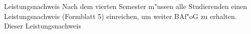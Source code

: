 \begin{artikel}{Leistungsnachweis}
\vspace{-0.2cm}
Nach dem vierten Semester m"ussen alle Studierenden einen Leistungsnachweis (Formblatt 5) einreichen, um weiter BAf"oG zu erhalten. Dieser Leistungsnachweis
\end{artikel}

